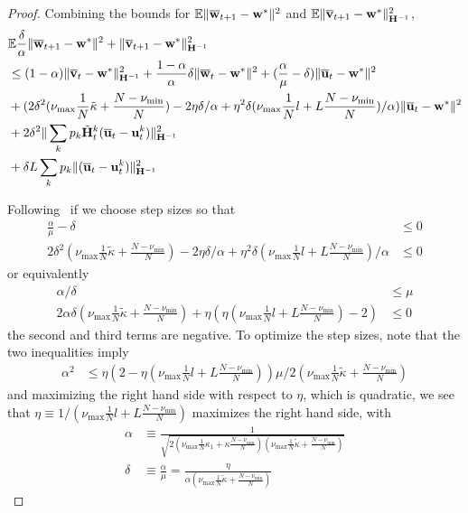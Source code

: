 \begin{proof}
	Combining the bounds for $\mathbb{E}\|{\overline{\mathbf{w}}}_{t+1}-{\mathbf{w}}^{\ast}\|^{2}$
	and $\mathbb{E}\|{\overline{\mathbf{v}}}_{t+1}-{\mathbf{w}}^{\ast}\|_{{\mathbf{H}}^{-1}}^{2}$, 
	\begin{align*}
	& \mathbb{E}\frac{\delta}{\alpha}\|{\overline{\mathbf{w}}}_{t+1}-{\mathbf{w}}^{\ast}\|^{2}+\|{\overline{\mathbf{v}}}_{t+1}-{\mathbf{w}}^{\ast}\|_{{\mathbf{H}}^{-1}}^{2}\\
	& \leq(1-\alpha)\|{\overline{\mathbf{v}}}_{t}-{\mathbf{w}}^{\ast}\|_{{\mathbf{H}}^{-1}}^{2}+\frac{1-\alpha}{\alpha}\delta\|{\overline{\mathbf{w}}}_{t}-{\mathbf{w}}^{\ast}\|^{2}+(\frac{\alpha}{\mu}-\delta)\|{\overline{\mathbf{u}}}_{t}-{\mathbf{w}}^{\ast}\|^{2}\\
	& +(2\delta^{2}(\nu_{\max}\frac{1}{N}\tilde{\kappa}+\frac{N-\nu_{\min}}{N})-2\eta\delta/\alpha+\eta^{2}\delta(\nu_{\max}\frac{1}{N}l+L\frac{N-\nu_{\min}}{N})/\alpha)\|{\overline{\mathbf{u}}}_{t}-{\mathbf{w}}^{\ast}\|^{2}\\
	& +2\delta^{2}\|\sum_{k}p_{k}\tilde{{\mathbf{H}}}_{t}^{k}({\overline{\mathbf{u}}}_{t}-{\mathbf{u}}_{t}^{k})\|_{{\mathbf{H}}^{-1}}^{2}\\
	& +\delta L\sum_{k}p_{k}\|({\overline{\mathbf{u}}}_{t}-{\mathbf{u}}_{t}^{k})\|_{{\mathbf{H}}^{-1}}^{2}
	\end{align*}
	
	Following~\cite{liu2018accelerating} if we choose step sizes so that 
	\begin{align*}
	\frac{\alpha}{\mu}-\delta & \leq0\\
	2\delta^{2}(\nu_{\max}\frac{1}{N}\tilde{\kappa}+\frac{N-\nu_{\min}}{N})-2\eta\delta/\alpha+\eta^{2}\delta(\nu_{\max}\frac{1}{N}l+L\frac{N-\nu_{\min}}{N})/\alpha & \leq0
	\end{align*}
	or equivalently 
	\begin{align*}
	\alpha/\delta & \leq\mu\\
	2\alpha\delta(\nu_{\max}\frac{1}{N}\tilde{\kappa}+\frac{N-\nu_{\min}}{N})+\eta(\eta(\nu_{\max}\frac{1}{N}l+L\frac{N-\nu_{\min}}{N})-2) & \leq0
	\end{align*}
	the second and third terms are negative. To optimize the step sizes,
	note that the two inequalities imply 
	\begin{align*}
	\alpha^{2} & \leq\eta(2-\eta(\nu_{\max}\frac{1}{N}l+L\frac{N-\nu_{\min}}{N}))\mu/2(\nu_{\max}\frac{1}{N}\tilde{\kappa}+\frac{N-\nu_{\min}}{N})
	\end{align*}
	and maximizing the right hand side with respect to $\eta$, which
	is quadratic, we see that $\eta\equiv1/(\nu_{\max}\frac{1}{N}l+L\frac{N-\nu_{\min}}{N})$
	maximizes the right hand side, with 
	\begin{align*}
	\alpha & \equiv\frac{1}{\sqrt{2(\nu_{\max}\frac{1}{N}\kappa_{1}+\kappa\frac{N-\nu_{\min}}{N})(\nu_{\max}\frac{1}{N}\tilde{\kappa}+\frac{N-\nu_{\min}}{N})}}\\
	\delta & \equiv\frac{\alpha}{\mu}=\frac{\eta}{\alpha(\nu_{\max}\frac{1}{N}\tilde{\kappa}+\frac{N-\nu_{\min}}{N})}
	\end{align*}
	

\end{proof}
